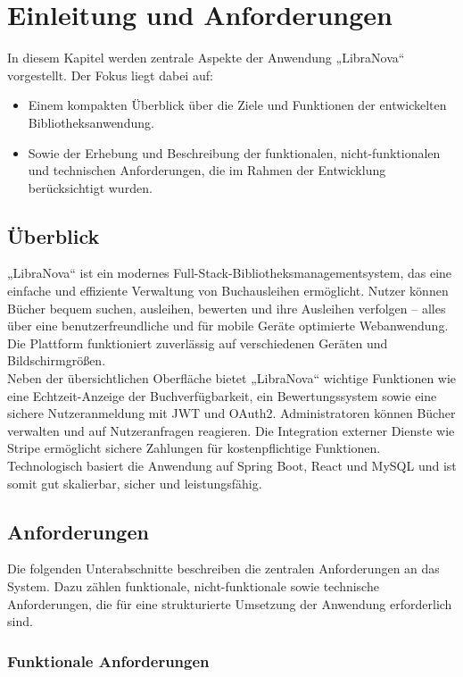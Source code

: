 \chapter{Einleitung und Anforderungen}
In diesem Kapitel werden zentrale Aspekte der Anwendung „LibraNova“ vorgestellt. Der Fokus liegt dabei auf:

\begin{itemize}
	\item Einem kompakten Überblick über die Ziele und Funktionen der entwickelten Bibliotheksanwendung.
	\item Sowie der Erhebung und Beschreibung der funktionalen, nicht-funktionalen und technischen Anforderungen, die im Rahmen der Entwicklung berücksichtigt wurden.
\end{itemize}

\section{Überblick}

„LibraNova“ ist ein modernes Full-Stack-Bibliotheksmanagementsystem, das eine einfache und effiziente Verwaltung von Buchausleihen ermöglicht. Nutzer können Bücher bequem suchen, ausleihen, bewerten und ihre Ausleihen verfolgen – alles über eine benutzerfreundliche und für mobile Geräte optimierte Webanwendung. Die Plattform funktioniert zuverlässig auf verschiedenen Geräten und Bildschirmgrößen.\\
Neben der übersichtlichen Oberfläche bietet „LibraNova“ wichtige Funktionen wie eine Echtzeit-Anzeige der Buchverfügbarkeit, ein Bewertungssystem sowie eine sichere Nutzeranmeldung mit JWT und OAuth2. Administratoren können Bücher verwalten und auf Nutzeranfragen reagieren. Die Integration externer Dienste wie Stripe ermöglicht sichere Zahlungen für kostenpflichtige Funktionen. Technologisch basiert die Anwendung auf Spring Boot, React und MySQL und ist somit gut skalierbar, sicher und leistungsfähig.

\section{Anforderungen}

Die folgenden Unterabschnitte beschreiben die zentralen Anforderungen an das System. Dazu zählen funktionale, nicht-funktionale sowie technische Anforderungen, die für eine strukturierte Umsetzung der Anwendung erforderlich sind.

\subsection{Funktionale Anforderungen}

